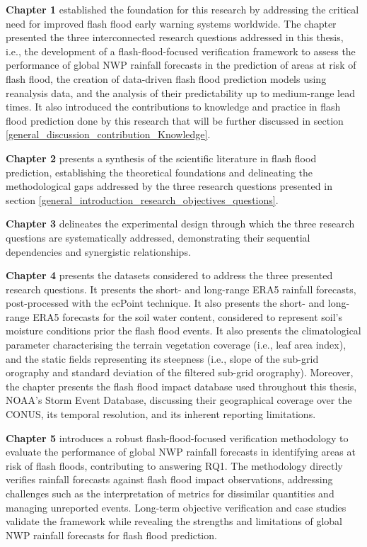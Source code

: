 \textbf{Chapter 1} established the foundation for this research by addressing the critical need for improved flash flood early warning systems worldwide. The chapter presented the three interconnected research questions addressed in this thesis, i.e., the development of a flash-flood-focused verification framework to assess the performance of global NWP rainfall forecasts in the prediction of areas at risk of flash flood, the creation of data-driven flash flood prediction models using reanalysis data, and the analysis of their predictability up to medium-range lead times. It also introduced the contributions to knowledge and practice in flash flood prediction done by this research that will be further discussed in section \ref{general_discussion_contribution_Knowledge}.

\textbf{Chapter 2} presents a synthesis of the scientific literature in flash flood prediction, establishing the theoretical foundations and delineating the methodological gaps addressed by the three research questions presented in section \ref{general_introduction_research_objectives_questions}.

\textbf{Chapter 3} delineates the experimental design through which the three research questions are systematically addressed, demonstrating their sequential dependencies and synergistic relationships.

\textbf{Chapter 4} presents the datasets considered to address the three presented research questions. It presents the short- and long-range ERA5 rainfall forecasts, post-processed with the ecPoint technique. It also presents the short- and long-range ERA5 forecasts for the soil water content, considered to represent soil's moisture conditions prior the flash flood events. It also presents the climatological parameter characterising the terrain vegetation coverage (i.e., leaf area index), and the static fields representing its steepness (i.e., slope of the sub-grid orography and standard deviation of the filtered sub-grid orography). Moreover, the chapter presents the flash flood impact database used throughout this thesis, NOAA's Storm Event Database, discussing their geographical coverage over the CONUS, its temporal resolution, and its inherent reporting limitations. 

\textbf{Chapter 5}
introduces a robust flash-flood-focused verification methodology to evaluate the performance of global NWP rainfall forecasts in identifying areas at risk of flash floods, contributing to answering RQ1. The methodology directly verifies rainfall forecasts against flash flood impact observations, addressing challenges such as the interpretation of metrics for dissimilar quantities and managing unreported events. Long-term objective verification and case studies validate the framework while revealing the strengths and limitations of global NWP rainfall forecasts for flash flood prediction. 

